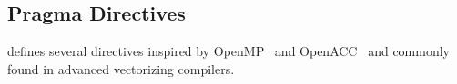 %
%
%
%
%
%
%

\subsection{Pragma Directives}

\pencil defines several directives inspired by OpenMP~\cite{openmp08} and OpenACC~\cite{openacc11}
and commonly found in advanced vectorizing compilers.


